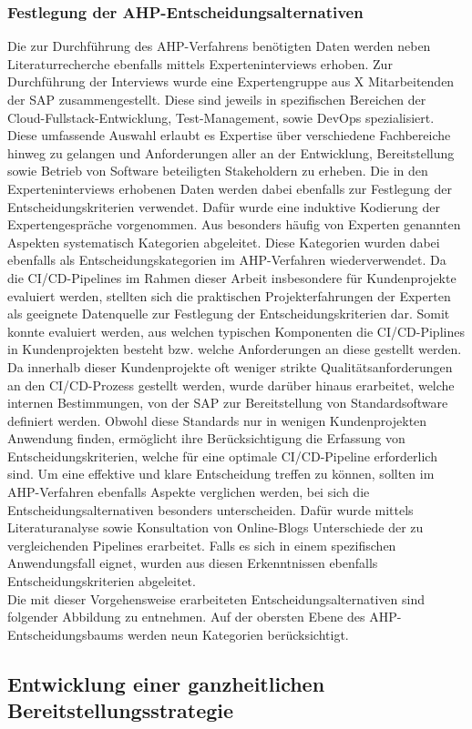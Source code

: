 \subsubsection{Festlegung der AHP-Entscheidungsalternativen}
 Die zur Durchführung des AHP-Verfahrens benötigten Daten werden neben  Literaturrecherche ebenfalls mittels Experteninterviews erhoben. Zur Durchführung der Interviews wurde eine Expertengruppe aus X Mitarbeitenden der SAP zusammengestellt. Diese sind jeweils in spezifischen Bereichen der Cloud-Fullstack-Entwicklung, Test-Management, sowie DevOps spezialisiert. Diese umfassende Auswahl erlaubt es Expertise über verschiedene Fachbereiche hinweg zu gelangen und Anforderungen aller an der Entwicklung, Bereitstellung sowie Betrieb von Software beteiligten Stakeholdern zu erheben. Die in den Experteninterviews erhobenen Daten werden dabei ebenfalls zur Festlegung der Entscheidungskriterien verwendet. Dafür wurde eine induktive Kodierung der Expertengespräche vorgenommen. Aus besonders häufig von Experten genannten Aspekten systematisch Kategorien abgeleitet. Diese Kategorien wurden dabei ebenfalls als Entscheidungskategorien im AHP-Verfahren wiederverwendet. Da die CI/CD-Pipelines im Rahmen dieser Arbeit insbesondere für Kundenprojekte evaluiert werden, stellten sich die praktischen Projekterfahrungen der Experten als geeignete Datenquelle zur Festlegung der Entscheidungskriterien dar. Somit konnte evaluiert werden, aus welchen typischen Komponenten die CI/CD-Piplines in Kundenprojekten besteht bzw. welche Anforderungen an diese gestellt werden. Da innerhalb dieser Kundenprojekte oft weniger strikte Qualitätsanforderungen an den CI/CD-Prozess gestellt werden, wurde darüber hinaus erarbeitet, welche internen Bestimmungen, von der SAP zur Bereitstellung von Standardsoftware definiert werden. Obwohl diese Standards nur in wenigen Kundenprojekten Anwendung finden, ermöglicht ihre Berücksichtigung die Erfassung von Entscheidungskriterien, welche für eine optimale CI/CD-Pipeline erforderlich sind. Um eine effektive und klare Entscheidung treffen zu können, sollten im AHP-Verfahren ebenfalls Aspekte verglichen werden, bei sich die Entscheidungsalternativen besonders unterscheiden. Dafür wurde mittels Literaturanalyse sowie Konsultation von Online-Blogs Unterschiede der zu vergleichenden Pipelines erarbeitet. Falls es sich in einem spezifischen Anwendungsfall eignet, wurden aus diesen Erkenntnissen ebenfalls Entscheidungskriterien abgeleitet.\\
 Die mit dieser Vorgehensweise erarbeiteten Entscheidungsalternativen sind folgender Abbildung zu entnehmen. Auf der obersten Ebene des AHP-Entscheidungsbaums werden neun Kategorien berücksichtigt. 





\subsection{Entwicklung einer ganzheitlichen Bereitstellungsstrategie}
